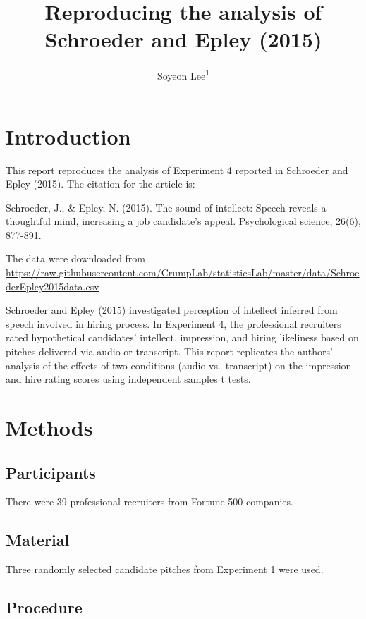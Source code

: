 \documentclass[
  english,
  man]{apa6}
\title{Reproducing the analysis of Schroeder and Epley (2015)}
\author{Soyeon Lee\textsuperscript{1}}
\date{}
\affiliation{\vspace{0.5cm}\textsuperscript{1} Brooklyn College of the City University of New York}
\begin{document}
\maketitle

\hypertarget{introduction}{%
\section{Introduction}\label{introduction}}

This report reproduces the analysis of Experiment 4 reported in Schroeder and Epley (2015). The citation for the article is:

Schroeder, J., \& Epley, N. (2015). The sound of intellect: Speech reveals a thoughtful mind, increasing a job candidate's appeal. Psychological science, 26(6), 877-891.

The data were downloaded from \url{https://raw.githubusercontent.com/CrumpLab/statisticsLab/master/data/SchroederEpley2015data.csv}

Schroeder and Epley (2015) investigated perception of intellect inferred from speech involved in hiring process. In Experiment 4, the professional recruiters rated hypothetical candidates' intellect, impression, and hiring likeliness based on pitches delivered via audio or transcript. This report replicates the authors' analysis of the effects of two conditions (audio vs.~transcript) on the impression and hire rating scores using independent samples t tests.

\hypertarget{methods}{%
\section{Methods}\label{methods}}

\hypertarget{participants}{%
\subsection{Participants}\label{participants}}

There were 39 professional recruiters from Fortune 500 companies.

\hypertarget{material}{%
\subsection{Material}\label{material}}

Three randomly selected candidate pitches from Experiment 1 were used.

\hypertarget{procedure}{%
\subsection{Procedure}\label{procedure}}
\end{document}
